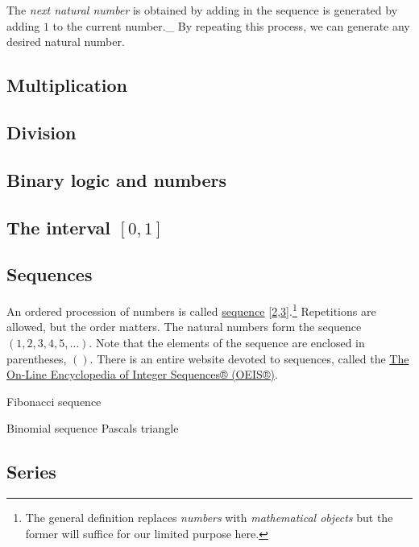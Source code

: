 \documentclass[
  a4paper,
]{article}
\begin{document}
The \emph{next natural number} is obtained by adding in the sequence is
generated by adding \(1\) to the current number.\_ By repeating this
process, we can generate any desired natural number.

\hypertarget{multiplication-1}{%
\subsection{Multiplication}\label{multiplication-1}}

\hypertarget{division-1}{%
\subsection{Division}\label{division-1}}

\hypertarget{binary-logic-and-numbers}{%
\subsection{Binary logic and numbers}\label{binary-logic-and-numbers}}

\hypertarget{the-interval-0-1}{%
\subsection{\texorpdfstring{The interval
\([0, 1]\)}{The interval {[}0, 1{]}}}\label{the-interval-0-1}}

\hypertarget{sequences}{%
\subsection{Sequences}\label{sequences}}

An ordered procession of numbers is called
\href{https://en.wikipedia.org/w/index.php?title=Sequence\&oldid=1177801065}{sequence}
{[}\protect\hyperlink{ref-wikisequence}{2},\protect\hyperlink{ref-wolframsequence}{3}{]}.\footnote{The
  general definition replaces \emph{numbers} with \emph{mathematical
  objects} but the former will suffice for our limited purpose here.}
Repetitions are allowed, but the order matters. The natural numbers form
the sequence \((1, 2, 3, 4, 5, \ldots)\). Note that the elements of the
sequence are enclosed in parentheses, \(()\). There is an entire website
devoted to sequences, called the \href{https://oeis.org/}{The On-Line
Encyclopedia of Integer Sequences® (OEIS®)}.

Fibonacci sequence

Binomial sequence Pascals triangle

\hypertarget{series}{%
\subsection{Series}\label{series}}
\end{document}
